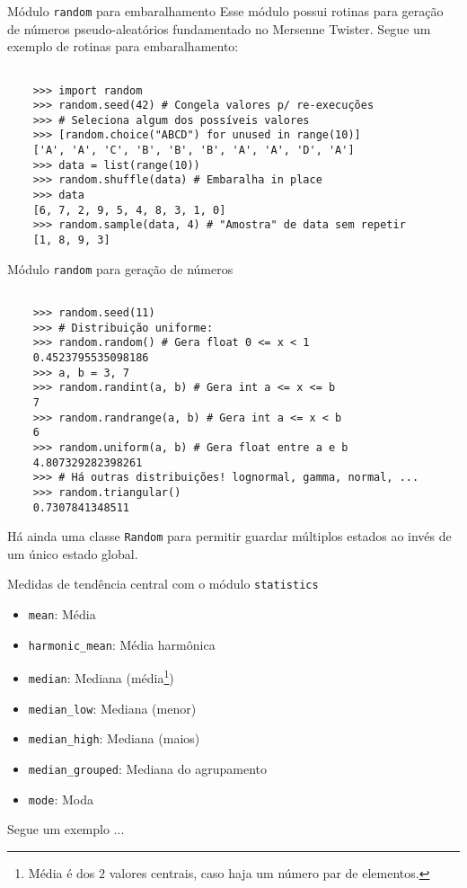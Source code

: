 \documentclass[utf8]{beamer}
\begin{document}
\begin{frame}[fragile]{Módulo \texttt{random} para embaralhamento}
  Esse módulo possui rotinas para geração de números pseudo-aleatórios
  fundamentado no Mersenne Twister.
  Segue um exemplo de rotinas para embaralhamento:

  \begin{verbatim}

    >>> import random
    >>> random.seed(42) # Congela valores p/ re-execuções
    >>> # Seleciona algum dos possíveis valores
    >>> [random.choice("ABCD") for unused in range(10)]
    ['A', 'A', 'C', 'B', 'B', 'B', 'A', 'A', 'D', 'A']
    >>> data = list(range(10))
    >>> random.shuffle(data) # Embaralha in place
    >>> data
    [6, 7, 2, 9, 5, 4, 8, 3, 1, 0]
    >>> random.sample(data, 4) # "Amostra" de data sem repetir
    [1, 8, 9, 3]

  \end{verbatim}

\end{frame}


\begin{frame}[fragile]{Módulo \texttt{random} para geração de números}
  \begin{verbatim}

    >>> random.seed(11)
    >>> # Distribuição uniforme:
    >>> random.random() # Gera float 0 <= x < 1
    0.4523795535098186
    >>> a, b = 3, 7
    >>> random.randint(a, b) # Gera int a <= x <= b
    7
    >>> random.randrange(a, b) # Gera int a <= x < b
    6
    >>> random.uniform(a, b) # Gera float entre a e b
    4.807329282398261
    >>> # Há outras distribuições! lognormal, gamma, normal, ...
    >>> random.triangular()
    0.7307841348511

  \end{verbatim}

  Há ainda uma classe \texttt{Random} para permitir
  guardar múltiplos estados ao invés de um único estado global.
\end{frame}


\begin{frame}{Medidas de tendência central
              com o módulo \texttt{statistics}}
  \begin{itemize}
    \item \texttt{mean}: Média
    \item \texttt{harmonic_mean}: Média harmônica
    \item \texttt{median}: Mediana (média\footnote{
      Média é dos $2$ valores centrais,
      caso haja um número par de elementos.
    })
    \item \texttt{median_low}: Mediana (menor)
    \item \texttt{median_high}: Mediana (maios)
    \item \texttt{median_grouped}: Mediana do agrupamento
    \item \texttt{mode}: Moda
  \end{itemize}

  Segue um exemplo ...

\end{frame}
\end{document}
